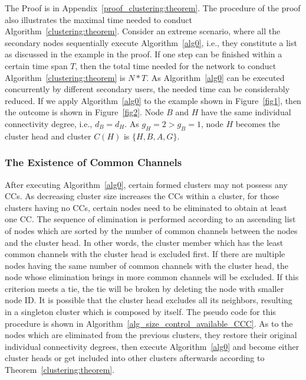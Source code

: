 \documentclass[times]{ettauth}
\newcommand{\ie}{i.e., }
\theoremstyle{mytheoremstyle}
\theoremstyle{mytheoremstyle}
\theoremstyle{mytheoremstyle}
\begin{document}
The Proof is in Appendix~\ref{proof_clustering:theorem}.
%
The procedure of the proof also illustrates the maximal time needed to conduct Algorithm~\ref{clustering:theorem}. 
Consider an extreme scenario, where all the secondary nodes sequentially execute Algorithm~\ref{alg0}, \ie they constitute a list as discussed in the example in the proof.
%
If one step can be finished within a certain time span $T$, then the total time needed for the network to conduct Algorithm~\ref{clustering:theorem} is $N*T$.
As Algorithm~\ref{alg0} can be executed concurrently by different secondary users, the needed time can be considerably reduced.
%
If we apply Algorithm~\ref{alg0} to the example shown in Figure~\ref{fig1}, then the outcome is shown in Figure~\ref{fig2}.
Node $B$ and $H$ have the same individual connectivity degree, i.e., $d_B=d_H$. As $g_H=2>g_B=1$, node $H$ becomes the cluster head and cluster $C(H)$ is $\{H, B, A, G\}$.
	




\subsubsection{The Existence of Common Channels}
\label{ross_p1_guarantee_ccc}
After executing Algorithm~\ref{alg0}, certain formed clusters may not possess any CCs.
As decreasing cluster size increases the CCs within a cluster, for those clusters having no CCs, certain nodes need to be eliminated to obtain at least one CC.
The sequence of elimination is performed according to an ascending list of nodes which are sorted by the number of common channels between the nodes and the cluster head. 
In other words, the cluster member which has the least common channels with the cluster head is excluded first.
If there are multiple nodes having the same number of common channels with the cluster head, the node whose elimination brings in more common channels will be excluded.
If this criterion meets a tie, the tie will be broken by deleting the node with smaller node ID.
It is possible that the cluster head excludes all its neighbors, resulting in a singleton cluster which is composed by itself.
The pseudo code for this procedure is shown in Algorithm~\ref{alg_size_control_available_CCC}.
As to the nodes which are eliminated from the previous clusters, they restore their original individual connectivity degrees, then execute Algorithm~\ref{alg0} and become either cluster heads or get included into other clusters afterwards according to Theorem~\ref{clustering:theorem}.
\end{document}
